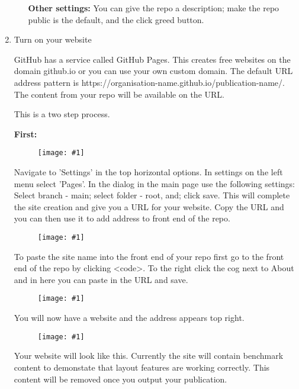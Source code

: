 \documentclass{article}
\newlength{\imgwidth}
\newcommand\scaledgraphics[2]{%
                
\settowidth{\imgwidth}{\texttt{[image: \#1]}}%
                
\setlength{\imgwidth}{\minof{\imgwidth}{#2\textwidth}}%
                
\texttt{[image: \#1]}%
                
}
\begin{document}
\begin{enumerate}
\begin{enumerate}[start=2]
\textbf{Other settings:} You can give the repo a description; make the repo public is the default, and the click greed button.


\end{enumerate}

\item Turn on your website


GitHub has a service called GitHub Pages. This creates free websites on the domain github.io or you can use your own custom domain. The default URL address pattern is https://organisation-name.github.io/publication-name/. The content from your repo will be available on the URL. 


This is a two step process.


\textbf{First:}

\begin{figure}
\scaledgraphics{cd4aad9d-5d95-4ecd-944d-f1f6ce8e75f3.png}{1}
\label{F72332451}
\end{figure}


Navigate to 'Settings' in the top horizontal options. In settings on the left menu select 'Pages'. In the dialog in the main page use the following settings: Select branch - main; select folder - root, and; click save. This will complete the site creation and give you a URL for your website. Copy the URL and you can then use it to add address to front end of the repo.

\begin{figure}
\scaledgraphics{d941d969-3938-4dec-aa57-a45debb46e84.png}{1}
\label{F78400191}
\end{figure}


To paste the site name into the front end of your repo first go to the front end of the repo by clicking <code>. To the right click the cog next to About and in here you can paste in the URL and save.

\begin{figure}
\scaledgraphics{7b251363-3e8f-4da0-9185-bb245e4aaa97.png}{1}
\label{F80239021}
\end{figure}


You will now have a website and the address appears top right.

\begin{figure}
\scaledgraphics{8a364c1f-1553-4b44-9974-77307c345b2e.png}{1}
\label{F8612631}
\end{figure}


Your website will look like this. Currently the site will contain benchmark content to demonstate that layout features are working correctly. This content will be removed once you output your publication.


\end{enumerate}
\end{document}
